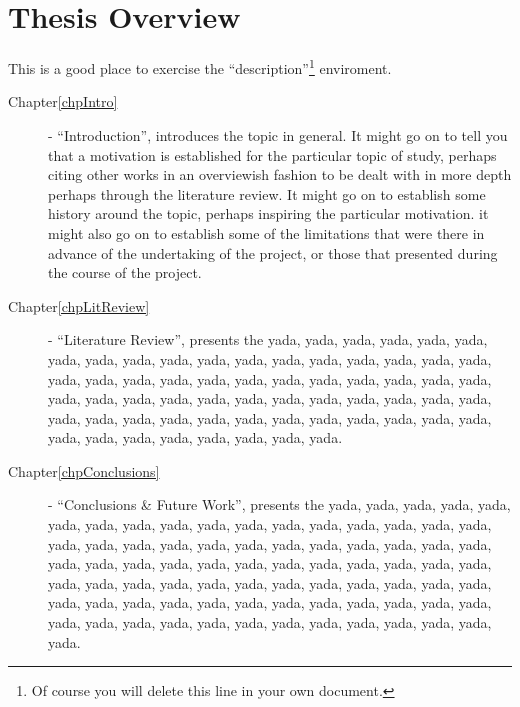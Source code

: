 
\section{Thesis Overview}
\label{chpIntro-secThesisOverview}

This is a good place to exercise the ``description''\footnote{Of course you will delete this line in your own document.} enviroment.

\begin{description}
	\item[Chapter\ref{chpIntro}] - ``Introduction'', introduces the topic in general. It might go on to tell you that
		a motivation is established for the particular topic of study, perhaps citing other works in an overviewish
		fashion to be dealt with in more depth perhaps through the literature review. It might go on to establish
		some history around the topic, perhaps inspiring the particular motivation. it might also go on to establish
		some of the limitations that were there in advance of the undertaking of the project, or those that presented
		during the course of the project.
	\item[Chapter\ref{chpLitReview}] - ``Literature Review'', presents the yada, yada, yada, yada, yada, yada, yada, yada,
		yada, yada, yada, yada, yada, yada, yada, yada, yada, yada, yada, yada, yada, yada, yada, yada, yada, yada,
		yada, yada, yada, yada, yada, yada, yada, yada, yada, yada, yada, yada, yada, yada, yada, yada, yada, yada,
		yada, yada, yada, yada, yada, yada, yada, yada, yada, yada, yada, yada, yada, yada, yada, yada, yada, yada.
	\item[Chapter\ref{chpConclusions}] - ``Conclusions \& Future Work'', presents the yada, yada, yada, yada, yada, yada,
		yada, yada, yada, yada, yada, yada, yada, yada, yada, yada, yada, yada, yada, yada, yada, yada, yada, yada,
		yada, yada, yada, yada, yada, yada, yada, yada, yada, yada, yada, yada, yada, yada, yada, yada, yada, yada,
		yada, yada, yada, yada, yada, yada, yada, yada, yada, yada, yada, yada, yada, yada, yada, yada, yada, yada,
		yada, yada, yada, yada, yada, yada, yada, yada, yada, yada, yada, yada, yada, yada, yada, yada, yada, yada.
\end{description}
